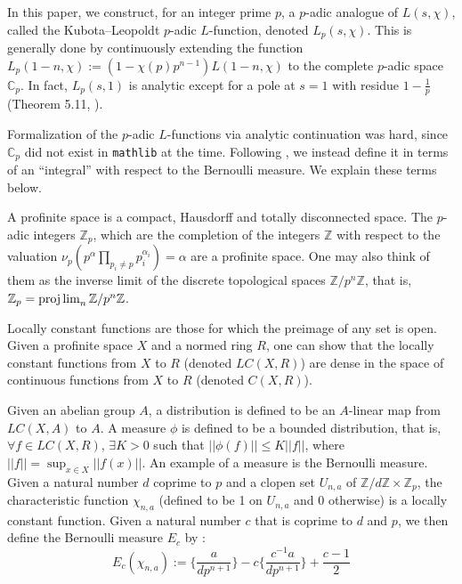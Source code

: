 \documentclass[a4paper,UKenglish,cleveref, autoref, thm-restate]{lipics-v2021}
\newcommand{\lean}[1]{\texttt{#1}\xspace} %
\begin{document}
In this paper, we construct, for an integer prime $p$, a $p$-adic analogue of $L(s, \chi)$, 
called the Kubota--Leopoldt $p$-adic $L$-function, denoted $L_p(s, \chi)$. This is generally done by continuously extending the function 
$L_p(1 - n, \chi) := (1 - \chi (p) p^{n - 1}) L(1 - n, \chi)$ to the complete $p$-adic space 
$\mathbb{C}_p$. In fact, $L_p(s, 1)$ is analytic except for a pole at $s = 1$ with residue 
$1 - \frac{1}{p}$ (Theorem 5.11, \cite{cyc}). 

Formalization of the $p$-adic $L$-functions via analytic continuation was hard, since $\mathbb{C}_p$ did not exist 
in \lean{mathlib} at the time. Following \cite{cyc}, 
we instead define it in terms of an ``integral'' with respect to the Bernoulli measure. We explain these terms below. 

A profinite space is a compact, Hausdorff and totally disconnected space. The $p$-adic integers 
$\mathbb{Z}_p$, which are the completion of the integers $\mathbb{Z}$ with respect to the 
valuation $\nu_p(p^{\alpha} \prod_{p_i \ne p} p_i^{\alpha_i}) = \alpha$ are a profinite space. 
One may also think of them as the inverse limit of the discrete topological spaces 
$\mathbb{Z} / p^{n} \mathbb{Z}$, that is, $\mathbb{Z}_p = \projlim_{n} \mathbb{Z} / p^{n} \mathbb{Z}$. 

Locally constant functions are those for which the preimage of any set is open. Given a profinite space $X$ and a normed ring $R$, 
one can show that the locally constant functions from $X$ to $R$ (denoted $LC(X, R)$) are dense in the space of continuous 
functions from $X$ to $R$ (denoted $C(X, R)$).

Given an abelian group $A$, a distribution is defined to be an $A$-linear map from $LC(X, A)$ 
to $A$. A measure $\phi$ is defined to be a bounded distribution, that is, $\forall f \in LC(X, R)$, 
$\exists K > 0$ such that $|| \phi (f) || \le K ||f|| $, where $||f|| = \sup_{x \in X} || f(x)||$. 
An example of a measure is the Bernoulli measure. Given a natural number $d$ coprime to $p$ and a clopen set $U_{n, a}$ of 
$\mathbb{Z}/ d \mathbb{Z} \times \mathbb{Z}_p$, the characteristic function $\chi_{n, a}$ 
(defined to be 1 on $U_{n, a}$ and 0 otherwise) is a locally constant function. 
Given a natural number $c$ that is coprime to $d$ and $p$, we then define the Bernoulli measure $E_c$ by :
$$ E_c(\chi_{n, a}) := \bigg \{ \frac{a}{d p^{n + 1}} \bigg \} - c \bigg \{ \frac{c^{-1} a}{d p^{n + 1}} \bigg \} + \frac{c - 1}{2} $$
\end{document}
